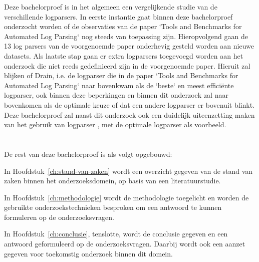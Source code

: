 
Deze bachelorproef is in het algemeen een vergelijkende studie van de verschillende logparsers. In eerste instantie gaat binnen deze bachelorproef onderzocht worden of de observaties van de paper `Tools and Benchmarks for Automated Log Parsing` \autocite{TBA2019} nog steeds van toepassing zijn. Hieropvolgend gaan de 13 log parsers van de voorgenoemde paper onderhevig gesteld worden aan nieuwe datasets. Als laatste stap gaan er extra logparsers toegevoegd worden aan het onderzoek die niet reeds gedefinieerd zijn in de voorgenoemde paper. Hieruit zal blijken of Drain, i.e. de logparser die in de paper `Tools and Benchmarks for Automated Log Parsing` \autocite{TBA2019} naar bovenkwam als de `beste` en meest efficiënte logparser, ook binnen deze beperkingen en binnen dit onderzoek zal naar bovenkomen als de optimale keuze of dat een andere logparser er bovenuit blinkt. Deze bachelorproef zal naast dit onderzoek ook een duidelijk uiteenzetting maken van het gebruik van logparser \autocite{TBA2019}, met de optimale logparser als voorbeeld. 

\section{}
\label{sec:opzet-bachelorproef}


De rest van deze bachelorproef is als volgt opgebouwd:

In Hoofdstuk~\ref{ch:stand-van-zaken} wordt een overzicht gegeven van de stand van zaken binnen het onderzoeksdomein, op basis van een literatuurstudie.

In Hoofdstuk~\ref{ch:methodologie} wordt de methodologie toegelicht en worden de gebruikte onderzoekstechnieken besproken om een antwoord te kunnen formuleren op de onderzoeksvragen.


In Hoofdstuk~\ref{ch:conclusie}, tenslotte, wordt de conclusie gegeven en een antwoord geformuleerd op de onderzoeksvragen. Daarbij wordt ook een aanzet gegeven voor toekomstig onderzoek binnen dit domein.